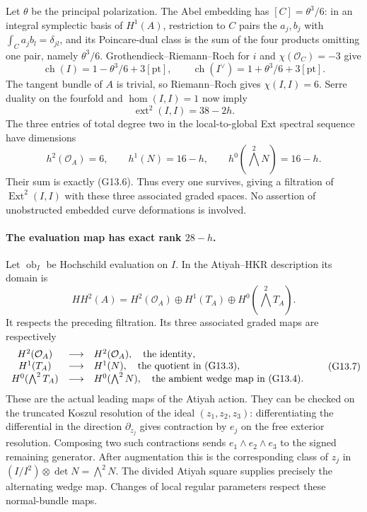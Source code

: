 Let $\theta$ be the principal polarization. The Abel embedding
has $[C]=\theta^3/6$: in an integral symplectic basis of
$H^1(A)$, restriction to $C$ pairs the $a_j,b_j$ with
$\int_Ca_jb_l=\delta_{jl}$, and its Poincare-dual class is the
sum of the four products omitting one pair, namely $\theta^3/6$.
Grothendieck--Riemann--Roch for $i$ and $\chi(\mathcal O_C)=-3$
give
\[
 \operatorname{ch}(I)=1-\theta^3/6+3[\mathrm{pt}],\qquad
 \operatorname{ch}(I^\vee)=1+\theta^3/6+3[\mathrm{pt}].
\]
The tangent bundle of $A$ is trivial, so Riemann--Roch gives
$\chi(I,I)=6$. Serre duality on the fourfold and
$\operatorname{hom}(I,I)=1$ now imply
\[
 \operatorname{ext}^2(I,I)=38-2h.                         \tag{G13.6}
\]
The three entries of total degree two in the local-to-global
Ext spectral sequence have dimensions
\[
 h^2(\mathcal O_A)=6,\qquad h^1(N)=16-h,
 \qquad h^0(\textstyle\bigwedge^2N)=16-h.
\]
Their sum is exactly (G13.6). Thus every one survives, giving
a filtration of $\operatorname{Ext}^2(I,I)$ with these three
associated graded spaces. No assertion of unobstructed embedded
curve deformations is involved.

\paragraph{The evaluation map has exact rank $28-h$.}
Let $\operatorname{ob}_I$ be Hochschild evaluation on $I$.
In the Atiyah--HKR description its domain is
\[
 HH^2(A)=H^2(\mathcal O_A)\oplus H^1(T_A)
                         \oplus H^0(\textstyle\bigwedge^2T_A).
\]
It respects the preceding filtration. Its three associated
graded maps are respectively
\[
 \begin{array}{ccl}
 H^2(\mathcal O_A)&\longrightarrow&H^2(\mathcal O_A),
       \quad\hbox{the identity},\\
 H^1(T_A)&\longrightarrow&H^1(N),
       \quad\hbox{the quotient in (G13.3)},\\
 H^0(\bigwedge^2T_A)&\longrightarrow&H^0(\bigwedge^2N),
       \quad\hbox{the ambient wedge map in (G13.4)}.
 \end{array}                                             \tag{G13.7}
\]
These are the actual leading maps of the Atiyah action. They
can be checked on the truncated Koszul resolution of the ideal
$(z_1,z_2,z_3)$: differentiating the differential in the direction
$\partial_{z_j}$ gives contraction by $e_j$ on the free exterior
resolution. Composing two such contractions sends
$e_1\wedge e_2\wedge e_3$ to the signed remaining generator.
After augmentation this is the corresponding class of $z_j$
in $(I/I^2)\otimes\det N=\bigwedge^2N$. The divided Atiyah
square supplies precisely the alternating wedge map. Changes
of local regular parameters respect these normal-bundle maps.

